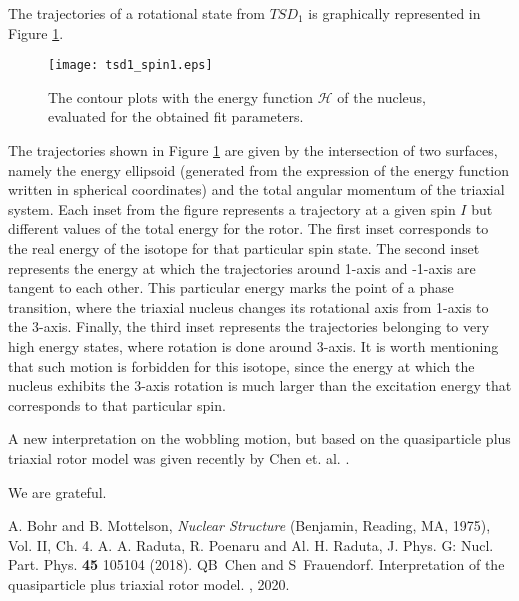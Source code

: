 \documentclass[myclassdoc,debug]{rjparticle}
\begin{document}
The trajectories of a rotational state from $TSD_1$  is graphically represented in Figure \ref{trajectory}.

\begin{figure}[ht]
    \centering
    \texttt{[image: tsd1\_spin1.eps]}
    \caption{The contour plots with the energy function $\mathcal{H}$ of the nucleus, evaluated for the obtained fit parameters.}
    \label{trajectory}
\end{figure}

The trajectories shown in Figure \ref{trajectory} are given by the intersection of two surfaces, namely the energy ellipsoid (generated from the expression of the energy function written in spherical coordinates) and the total angular momentum of the triaxial system. Each inset from the figure represents a trajectory at a given spin $I$ but different values of the total energy for the rotor. The first inset corresponds to the real energy of the isotope for that particular spin state. The second inset represents the energy at which the trajectories around 1-axis and -1-axis are tangent to each other. This particular energy marks the point of a phase transition, where the triaxial nucleus changes its rotational axis from 1-axis to the 3-axis. Finally, the third inset represents the trajectories belonging to very high energy states, where rotation is done around 3-axis. It is worth mentioning that such motion is forbidden for this isotope, since the energy at which the nucleus exhibits the 3-axis rotation is much larger than the excitation energy that corresponds to that particular spin.

A new interpretation on the wobbling motion, but based on the quasiparticle plus triaxial rotor model was given recently by Chen et. al. \cite{chen2020interpretation}.

\begin{acknowledgement}
We are grateful.
\end{acknowledgement}

\begin{thebibliography}{99}

A.  Bohr and B.  Mottelson, {\it Nuclear Structure} (Benjamin, Reading, MA, 1975), Vol.  II, Ch.  4. 
A.  A.  Raduta, R.  Poenaru and Al.  H.  Raduta, J.  Phys.  G: Nucl.  Part.  Phys.  {\bf 45} 105104 (2018). 
 QB~Chen and S~Frauendorf. \newblock Interpretation of the quasiparticle plus triaxial rotor model. , 2020.
\end{thebibliography}
\end{document}
